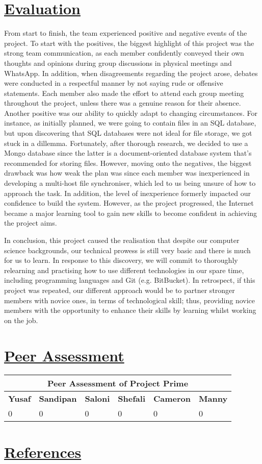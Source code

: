 \documentclass{article}
\begin{document}
\section{\underline{Evaluation}}
From start to finish, the team experienced  positive and negative events of the project. To start with the positives, the biggest highlight of this project was the strong team communication, as each member confidently conveyed their own thoughts and opinions during group discussions in physical meetings and WhatsApp. In addition, when disagreements regarding the project arose, debates were conducted in a respectful manner by not saying rude or offensive statements. Each member also made the effort to attend each group meeting throughout the project, unless there was a genuine reason for their absence. Another positive was our ability to quickly adapt to changing circumstances. For instance, as initially planned, we were going to contain files in an SQL database, but upon discovering that SQL databases were not ideal for file storage, we got stuck in a dillemma. Fortunately, after thorough research, we decided to use a Mongo database since the latter is a document-oriented database system that's recommended for storing files. However, moving onto the negatives, the biggest drawback was how weak the plan was since each member was inexperienced in developing a multi-host file synchroniser, which led to us being unsure of how to approach the task. In addition, the level of inexperience formerly impacted our confidence to build the system. However, as the project progressed, the Internet became a major learning tool to gain new skills to become confident in achieving the project aims.


In conclusion, this project caused the realisation that despite our computer science backgrounds, our technical prowess is still very basic and there is much for us to learn. In response to this discovery, we will commit to thoroughly relearning and practising how to use different technologies in our spare time, including programming languages and Git (e.g. BitBucket). In retrospect, if this project was repeated, our different approach would be to partner stronger members with novice ones, in terms of technological skill; thus, providing novice members with the opportunity to enhance their skills by learning whilst working on the job.   

\section{\underline{Peer Assessment}}
\begin{tabular}{|p{2cm}|p{2cm}|p{2cm}|p{2cm}|p{2cm}|p{2cm}|}
\hline
\multicolumn{6}{|c|}{\textbf{Peer Assessment of Project Prime}} \\
\hline
\textbf{Yusaf} & \textbf{Sandipan} & \textbf{Saloni} & \textbf{Shefali} & \textbf{Cameron} & \textbf{Manny} \\
\hline
0 & 0 & 0 & 0 & 0 & 0 \\
\hline
\end{tabular}
	
\section{\underline{References}}
\end{document}
